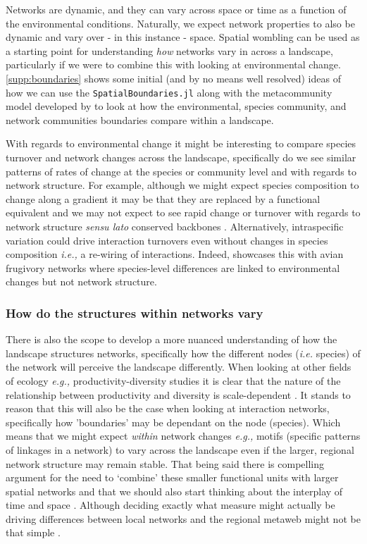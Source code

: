 Networks are dynamic, and they can vary across space \cite{Golubski2016EcoNet, Vazquez2007SpeAbu} or time \cite{Poisot2015SpeWhy, Trojelsgaard2016EcoNet} as a function of the environmental conditions. Naturally, we expect network properties to also be dynamic and vary over - in this instance - space. Spatial wombling can be used as a starting point for understanding \emph{how} networks vary in across a landscape, particularly if we were to combine this with looking at environmental change. \autoref{supp:boundaries} shows some initial (and by no means well resolved) ideas of how we can use the \texttt{SpatialBoundaries.jl} along with the metacommunity model developed by \cite{Thompson2017Dispersal} to look at how the environmental, species community, and network communities boundaries compare within a landscape.

With regards to environmental change it might be interesting to compare species turnover and network changes across the landscape, specifically do we see similar patterns of rates of change at the species or community level and with regards to network structure. For example, although we might expect species composition to change along a gradient it may be that they are replaced by a functional equivalent and we may not expect to see rapid change or turnover with regards to network structure \emph{sensu lato} conserved backbones \cite{Mora2018IdeCom}. Alternatively, intraspecific variation could drive interaction turnovers even without changes in species composition \cite{Bolnick2011WhyInt} \emph{i.e.,} a re-wiring of interactions. Indeed, \cite{Martins2022Global} showcases this with avian frugivory networks where species-level differences are linked to environmental changes but not network structure.

\subsubsection{How do the structures within networks vary}

There is also the scope to develop a more nuanced understanding of how
the landscape structures networks, specifically how the different nodes
(\emph{i.e.} species) of the network will perceive the landscape
differently. When looking at other fields of ecology \emph{e.g.,} productivity-diversity studies it is clear that the nature of the relationship between productivity and diversity is scale-dependent \cite{Chase2002SpaSca, Gillman2006InfPro}. It stands to reason that this will also be the case when looking at interaction networks, specifically how 'boundaries' may be dependant on the node (species). Which means that we might expect \emph{within} network changes \emph{e.g.,} motifs (specific patterns of linkages in a network) to vary across the landscape even if the larger, regional network structure may remain stable. That being said there is compelling argument for the need to `combine' these smaller functional units with larger spatial networks \cite{Fortin2021NetEcoa} and that we should also start thinking about the interplay of time and space \cite{Estay2023Editorial}. Although deciding exactly what measure might actually be driving differences between local networks and the regional metaweb might not be that simple \cite{Saravia2022Ecological}.

